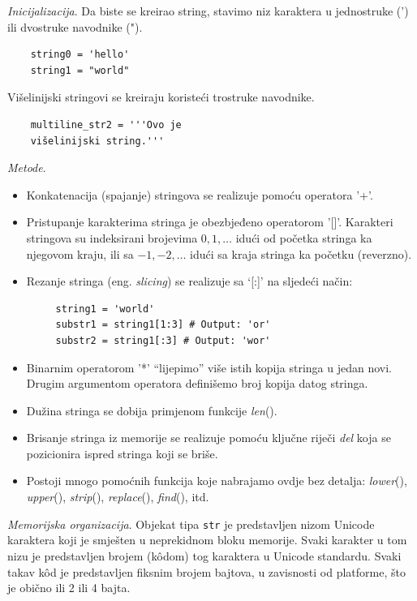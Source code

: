 \textit{Inicijalizacija}. Da biste se kreirao string, stavimo niz karaktera u jednostruke (') ili dvostruke navodnike (").

\begin{verbatim}
	string0 = 'hello'
	string1 = "world"
\end{verbatim}

Višelinijski stringovi se kreiraju koristeći trostruke navodnike. 

\begin{verbatim}
	multiline_str2 = '''Ovo je
	višelinijski string.'''
\end{verbatim}

\textit{Metode}.
\begin{itemize}
	\item Konkatenacija (spajanje) stringova se realizuje pomoću operatora '+'. 
	\item Pristupanje karakterima stringa je obezbjeđeno operatorom '[]'. Kara\-kteri stringova su indeksirani brojevima $0, 1,\ldots$ idući od početka stringa ka njegovom kraju, ili sa $-1, -2,\ldots$ idući sa kraja stringa ka početku  (reverzno). 
	\item Rezanje stringa (eng. \textit{slicing}) se realizuje sa `[:]' na sljedeći način:
	\begin{verbatim}
	 string1 = 'world'
	 substr1 = string1[1:3] # Output: 'or'
	 substr2 = string1[:3] # Output: 'wor'
	\end{verbatim}
	
	\item  Binarnim operatorom '*' ``lijepimo'' više istih kopija stringa u jedan novi. Drugim argumentom operatora definišemo broj kopija datog stringa.  
	\item Dužina stringa se dobija primjenom funkcije \emph{len}(). 
	\item Brisanje stringa iz memorije se realizuje pomoću ključne riječi \textit{del} koja se pozicionira ispred stringa koji se briše. 
    \item Postoji mnogo pomoćnih funkcija koje nabrajamo ovdje bez detalja: \textit{lower}(), \textit{upper}(), \textit{strip}(), \textit{replace}(), \textit{find}(), itd. 
\end{itemize}

\textit{Memorijska organizacija}. Objekat tipa \texttt{str} je predstavljen nizom Unicode karaktera koji je smješten u neprekidnom bloku memorije. Svaki karakter u tom nizu je predstavljen brojem (k\^odom) tog karaktera u Unicode standardu. Svaki takav k\^od je predstavljen fiksnim brojem bajtova, u zavisnosti od platforme, što je obično ili 2 ili 4 bajta. %

